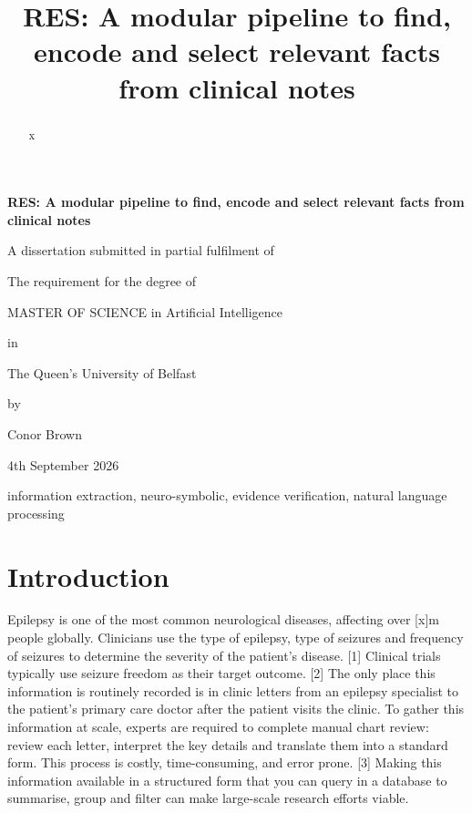 \documentclass[conference]{IEEEtran}
\begin{document}
\begin{titlepage}
    \centering

    {\Huge\bfseries RES: A modular pipeline to find, encode and select relevant facts from clinical notes\par}
    \vspace{2cm}

    {\large
    A dissertation submitted in partial fulfilment of\par
    The requirement for the degree of\par
    MASTER OF SCIENCE in Artificial Intelligence\par
    in\par
    The Queen’s University of Belfast\par
    by\par
    Conor Brown\par
    4th September 2026
    }
\end{titlepage}


\title{RES: A modular pipeline to find, encode and select relevant facts from clinical notes\\}



\maketitle

\begin{abstract}
x
\end{abstract}

\begin{IEEEkeywords}
information extraction, neuro-symbolic, evidence verification, 
natural language processing
\end{IEEEkeywords}

\section{Introduction}

Epilepsy is one of the most common neurological 
diseases, affecting over [x]m people globally. Clinicians use 
the type of epilepsy, type of seizures and frequency of 
seizures to determine the severity of the patient's disease. [1]
Clinical trials typically use seizure freedom as their target 
outcome. [2] The only place this information is routinely 
recorded is in clinic letters from an epilepsy specialist to 
the patient's primary care doctor after the patient visits the 
clinic. To gather this information at scale, experts are 
required to complete manual chart review: review each 
letter, interpret the key details and translate them into a 
standard form. This process is costly, time-consuming, 
and error prone. [3] Making this information available in a 
structured form that you can query in a database to 
summarise, group and filter can make large-scale
research efforts viable.
\end{document}
